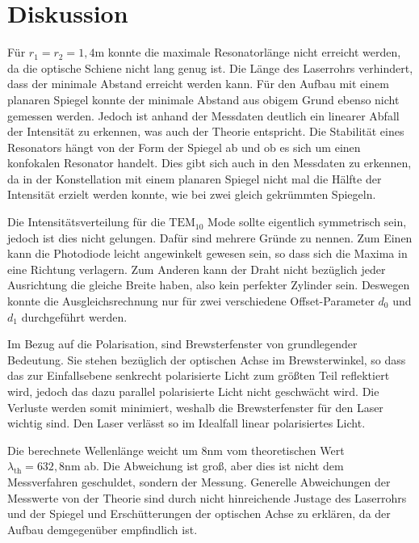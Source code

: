 \section{Diskussion}
Für \(r_1=r_2=1,4\)m konnte die maximale Resonatorlänge nicht erreicht werden, da die optische Schiene nicht lang genug ist. Die Länge des Laserrohrs verhindert, dass der minimale Abstand erreicht werden kann. Für den Aufbau mit einem planaren Spiegel konnte der minimale Abstand aus obigem Grund ebenso nicht gemessen werden. Jedoch ist anhand der Messdaten deutlich ein linearer Abfall der Intensität zu erkennen, was auch der Theorie entspricht. Die Stabilität eines Resonators hängt von der Form der Spiegel ab und ob es sich um einen konfokalen Resonator handelt. Dies gibt sich auch in den Messdaten zu erkennen, da in der Konstellation mit einem planaren Spiegel nicht mal die Hälfte der Intensität erzielt werden konnte, wie bei zwei gleich gekrümmten Spiegeln.

\noindent Die Intensitätsverteilung für die \(\text{TEM}_{10}\) Mode sollte eigentlich symmetrisch sein, jedoch ist dies nicht gelungen. Dafür sind mehrere Gründe zu nennen. Zum Einen kann die Photodiode leicht angewinkelt gewesen sein, so dass sich die Maxima in eine Richtung verlagern. Zum Anderen kann der Draht nicht bezüglich jeder Ausrichtung die gleiche Breite haben, also kein perfekter Zylinder sein. Deswegen konnte die Ausgleichsrechnung nur für zwei verschiedene Offset-Parameter \(d_0\) und \(d_1\) durchgeführt werden.

\noindent Im Bezug auf die Polarisation, sind Brewsterfenster von grundlegender Bedeutung. Sie stehen bezüglich der optischen Achse im Brewsterwinkel, so dass das zur Einfallsebene senkrecht polarisierte Licht zum größten Teil reflektiert wird, jedoch das dazu parallel polarisierte Licht nicht geschwächt wird. Die Verluste werden somit minimiert, weshalb die Brewsterfenster für den Laser wichtig sind. Den Laser verlässt so im Idealfall linear polarisiertes Licht.

\noindent Die berechnete Wellenlänge weicht um \(8\)nm vom theoretischen Wert \(\lambda_{\text{th}}=632,8\text{nm}\) ab. Die Abweichung ist groß, aber dies ist nicht dem Messverfahren geschuldet, sondern der Messung. Generelle Abweichungen der Messwerte von der Theorie sind durch nicht hinreichende Justage des Laserrohrs und der Spiegel und Erschütterungen der optischen Achse zu erklären, da der Aufbau demgegenüber empfindlich ist.